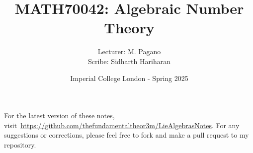 \documentclass[a4paper, 12pt, openany, oneside]{book}
\title{\vspace{-2em}MATH70042: Algebraic Number Theory}
\author{Lecturer: M. Pagano \\ Scribe: Sidharth Hariharan}
\date{Imperial College London - Spring 2025}
\begin{document}
\setlength{\abovedisplayskip}{7.5pt}  %
\setlength{\belowdisplayskip}{7.5pt}  %
\setlength{\abovedisplayshortskip}{2pt}
\setlength{\belowdisplayshortskip}{2pt}

\maketitle
\thispagestyle{empty}

\tableofcontents
\thispagestyle{empty}

\newpage

\nocite{*}



% 

% 

\newpage




\printbibliography[prenote=mybibnote]
\thispagestyle{empty}

For the latest version of these notes, visit~\url{https://github.com/thefundamentaltheor3m/LieAlgebrasNotes}. For any suggestions or corrections, please feel free to fork and make a pull request to my repository.
\end{document}
